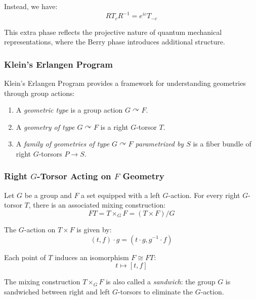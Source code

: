 Instead, we have:
\begin{equation}
R T_{c} R^{-1} = e^{i c} T_{-c}
\end{equation}

This extra phase reflects the projective nature of quantum mechanical representations, where the Berry phase introduces additional structure.

\subsubsection{Klein's Erlangen Program}

Klein's Erlangen Program provides a framework for understanding geometries through group actions:

\begin{definition}
\begin{enumerate}
\item A \emph{geometric type} is a group action \( G \curvearrowright F \).
\item A \emph{geometry of type \( G \curvearrowright F \)} is a right \( G \)-torsor \( T \).
\item A \emph{family of geometries of type \( G \curvearrowright F \) parametrized by \( S \)} is a fiber bundle of right \( G \)-torsors \( P \to S \).
\end{enumerate}
\end{definition}

\subsubsection{Right $G$-Torsor Acting on $F$ Geometry}

Let \( G \) be a group and \( F \) a set equipped with a left \( G \)-action. For every right \( G \)-torsor \( T \), there is an associated mixing construction:
\begin{equation}
FT = T \times_G F = (T \times F)/G
\end{equation}

The \( G \)-action on \( T \times F \) is given by:
\begin{equation}
(t, f) \cdot g = (t \cdot g, g^{-1} \cdot f)
\end{equation}

Each point of \( T \) induces an isomorphism \( F \cong FT \):
\begin{equation}
t \mapsto [t,f]
\end{equation}

The mixing construction \( T \times_G F \) is also called a \emph{sandwich}: the group \( G \) is sandwiched between right and left \( G \)-torsors to eliminate the \( G \)-action.

